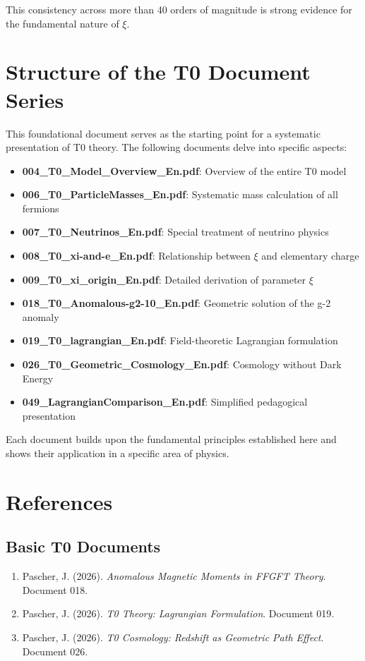 	This consistency across more than 40 orders of magnitude is strong evidence for the fundamental nature of $\xi$.
	
	\section{Structure of the T0 Document Series}
	
	This foundational document serves as the starting point for a systematic presentation of T0 theory. The following documents delve into specific aspects:
	
	\begin{itemize}
		\item \textbf{004\_T0\_Model\_Overview\_En.pdf}: Overview of the entire T0 model
		\item \textbf{006\_T0\_ParticleMasses\_En.pdf}: Systematic mass calculation of all fermions
		\item \textbf{007\_T0\_Neutrinos\_En.pdf}: Special treatment of neutrino physics
		\item \textbf{008\_T0\_xi-and-e\_En.pdf}: Relationship between $\xi$ and elementary charge
		\item \textbf{009\_T0\_xi\_origin\_En.pdf}: Detailed derivation of parameter $\xi$
		\item \textbf{018\_T0\_Anomalous-g2-10\_En.pdf}: Geometric solution of the g-2 anomaly
		\item \textbf{019\_T0\_lagrangian\_En.pdf}: Field-theoretic Lagrangian formulation
		\item \textbf{026\_T0\_Geometric\_Cosmology\_En.pdf}: Cosmology without Dark Energy
		\item \textbf{049\_LagrangianComparison\_En.pdf}: Simplified pedagogical presentation
	\end{itemize}
	
	Each document builds upon the fundamental principles established here and shows their application in a specific area of physics.
	
	\section{References}
	
	\subsection{Basic T0 Documents}
	
	\begin{enumerate}
		\item Pascher, J. (2026). \textit{Anomalous Magnetic Moments in FFGFT Theory}. Document 018.
		\item Pascher, J. (2026). \textit{T0 Theory: Lagrangian Formulation}. Document 019.
		\item Pascher, J. (2026). \textit{T0 Cosmology: Redshift as Geometric Path Effect}. Document 026.
	\end{enumerate}
	
